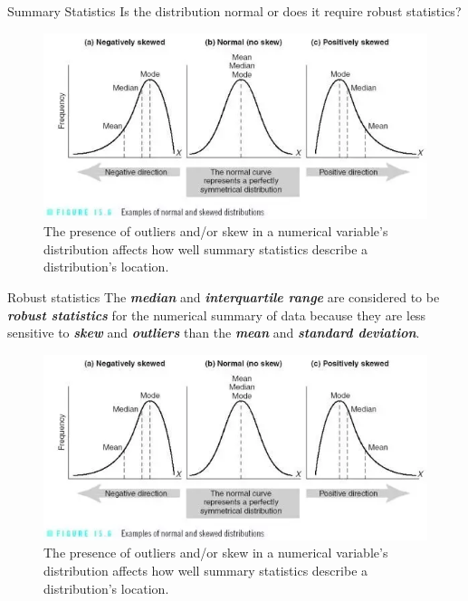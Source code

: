 \documentclass[
  ignorenonframetext,
]{beamer}
\begin{document}
\begin{frame}{Summary Statistics}
\label{summary-statistics}
Is the distribution normal or does it require robust statistics?

\begin{figure}[H]

{\centering \includegraphics{class05/outlier_statistics.png}

}

\caption{The presence of outliers and/or skew in a numerical variable's
distribution affects how well summary statistics describe a
distribution's location.}

\end{figure}%
\end{frame}

\begin{frame}{Robust statistics}
\label{robust-statistics}
The \textbf{\emph{median}} and \textbf{\emph{interquartile range}} are
considered to be \textbf{\emph{robust statistics}} for the numerical
summary of data because they are less sensitive to \textbf{\emph{skew}}
and \textbf{\emph{outliers}} than the \textbf{\emph{mean}} and
\textbf{\emph{standard deviation}}.

\begin{figure}[H]

{\centering \includegraphics{class05/outlier_statistics.png}

}

\caption{The presence of outliers and/or skew in a numerical variable's
distribution affects how well summary statistics describe a
distribution's location.}

\end{figure}%
\end{frame}
\end{document}
